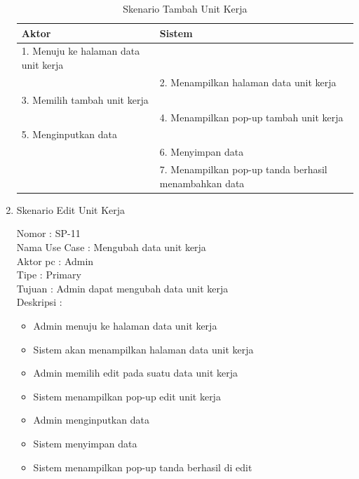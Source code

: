 \begin{enumerate}
\begin{itemize}
\end{itemize}

\begin{table}
	\caption{Skenario Tambah Unit Kerja}
	\centering
	\begin{tabular}{ | l | p{65mm} |}
		\hline 
		\textbf{Aktor} & \textbf{Sistem} \\
		\hline
		
		1.	Menuju ke halaman data unit kerja &  \\
		
		\hline
		
		&  2.	Menampilkan halaman data unit kerja \\
		
		\hline
		
		3. Memilih tambah unit kerja & \\
		
		\hline
		
		& 4.	Menampilkan pop-up tambah unit kerja \\
		
		\hline
		
		5.	Menginputkan data  & \\
		\hline
		
		& 6.	Menyimpan data \\
		\hline
		
		& 7.	Menampilkan pop-up tanda berhasil menambahkan data \\
		\hline
		
	\end{tabular}
\end{table}

\item Skenario Edit Unit Kerja

Nomor \kern 3.6pc : SP-11 \\
Nama Use Case : Mengubah data unit kerja \\
Aktor  pc : Admin \\
Tipe \kern 4.6pc : Primary \\
Tujuan \kern 3.6pc : Admin dapat mengubah data unit kerja \\
Deskripsi \kern 2.5pc : 

\begin{itemize}
	\item Admin menuju ke halaman data unit kerja
	\item Sistem akan menampilkan halaman data unit kerja
	\item Admin memilih edit pada suatu data unit kerja
	\item Sistem menampilkan pop-up edit unit kerja
	\item Admin menginputkan data
	\item Sistem menyimpan data
	\item Sistem menampilkan pop-up tanda berhasil di edit
	

\end{itemize}
\end{enumerate}

